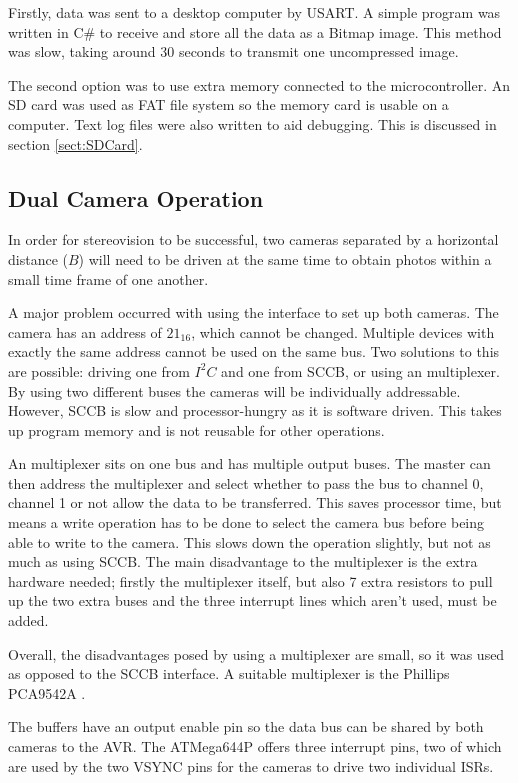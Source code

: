 Firstly, data was sent to a desktop computer by USART. A simple program was written in C\# to receive and store all the data as a Bitmap image. This method was slow, taking around 30 seconds to transmit one uncompressed image. 

The second option was to use extra memory connected to the microcontroller. An SD card was used as FAT file system so the memory card is usable on a computer. Text log files were also written to aid debugging. This is discussed in section \ref{sect:SDCard}. 

\subsection{Dual Camera Operation}
In order for stereovision to be successful, two cameras separated by a horizontal distance ($B$) will need to be driven at the same time to obtain photos within a small time frame of one another.

A major problem occurred with using the \itc interface to set up both cameras. The camera has an \itc address of $21_{16}$, which cannot be changed. Multiple \itc devices with exactly the same address cannot be used on the same bus. 
Two solutions to this are possible: driving one from $I^{2}C$ and one from SCCB, or using an \itc multiplexer. By using two different buses the cameras will be individually addressable. However, SCCB is slow and processor-hungry as it is software driven. This takes up program memory and is not reusable for other operations.

An \itc multiplexer sits on one \itc bus and has multiple output buses. The master can then address the multiplexer and select whether to pass the bus to channel 0, channel 1 or not allow the data to be transferred. This saves processor time, but means a write operation has to be done to select the camera bus before being able to write to the camera. This slows down the operation slightly, but not as much as using SCCB. The main disadvantage to the \itc multiplexer is the extra hardware needed; firstly the multiplexer itself, but also 7 extra resistors to pull up the two extra buses and the three interrupt lines which aren't used, must be added. 

Overall, the disadvantages posed by using a multiplexer are small, so it was used as opposed to the SCCB interface. A suitable multiplexer is the Phillips PCA9542A \citep{I2C_Mux}.

The buffers have an output enable pin so the data bus can be shared by both cameras to the AVR. The ATMega644P offers three interrupt pins, two of which are used by the two VSYNC pins for the cameras to drive two individual ISRs. 

